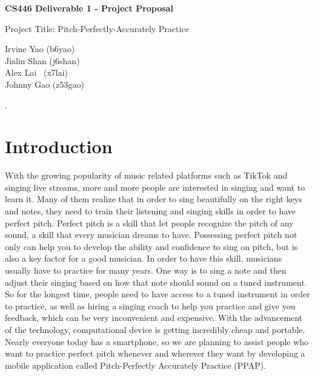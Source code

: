 \documentclass{article}
\begin{document}
\begin{titlepage}
   \vspace*{270px}
  \begin{center}

    \Large\textbf{CS446 Deliverable 1 - Project Proposal}

   \vspace{50px}

    \Large{Project Title: Pitch-Perfectly-Accurately Practice}

   \vspace{50px}

    \large{Irvine Yao (b6yao)\\Jialin Shan (j6shan)\\Alex Lai \ (x7lai)\\Johnny Gao (z53gao)}

  \end{center}
\end{titlepage}
  
.


\section{Introduction}
\label{sec:introduction}
\qquad
		With the growing popularity of music related platforms such as TikTok and singing live streams, more and more people are interested in singing and want to learn it.
		Many of them realize that in order to sing beautifully on the right keys and notes, they need to train their listening and singing skills in order to have perfect pitch. 
		Perfect pitch is a skill that let people recognize the pitch of any sound, a skill that every musician dreams to have. 
		Possessing perfect pitch not only can help you to develop the ability and confidence to sing on pitch, but is also a key factor for a good musician. 
		In order to have this skill, musicians usually have to practice for many years. 
		One way is to sing a note and then adjust their singing based on how that note should sound on a tuned instrument. 
		So for the longest time, people need to have access to a tuned instrument in order to practice, as well as hiring a singing coach to help you practice and give you feedback, which can be very inconvenient and expensive. 
		With the advancement of the technology, computational device is getting incredibly cheap and portable. 
		Nearly everyone today has a smartphone, so we are planning to assist people who want to practice perfect pitch whenever and wherever they want by developing a mobile application called Pitch-Perfectly Accurately Practice (PPAP). 
\end{document}
